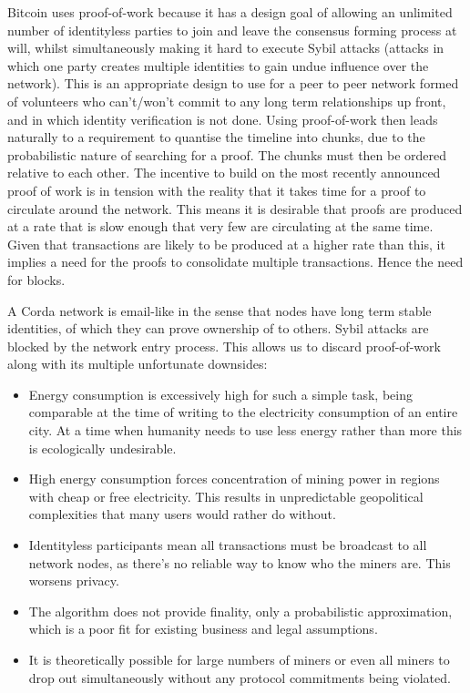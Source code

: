 \documentclass{article}
\begin{document}
Bitcoin uses proof-of-work because it has a design goal of allowing an unlimited number of identityless parties to
join and leave the consensus forming process at will, whilst simultaneously making it hard to execute Sybil attacks (attacks in which
one party creates multiple identities to gain undue influence over the network). This is an appropriate design to
use for a peer to peer network formed of volunteers who can't/won't commit to any long term relationships up front,
and in which identity verification is not done. Using proof-of-work then leads naturally to a requirement to
quantise the timeline into chunks, due to the probabilistic nature of searching for a proof. The chunks must then
be ordered relative to each other. The incentive to build on the most recently announced proof of work is in
tension with the reality that it takes time for a proof to circulate around the network. This means it is desirable
that proofs are produced at a rate that is slow enough that very few are circulating at the same time. Given that
transactions are likely to be produced at a higher rate than this, it implies a need for the proofs to consolidate
multiple transactions. Hence the need for blocks.

A Corda network is email-like in the sense that nodes have long term stable identities, of which they can prove
ownership of to others. Sybil attacks are blocked by the network entry process. This allows us to discard
proof-of-work along with its multiple unfortunate downsides:

\begin{itemize}
\item Energy consumption is excessively high for such a simple task, being comparable at the time of writing to the
electricity consumption of an entire city\cite{BitcoinEnergy}. At a time when humanity needs to use less energy
rather than more this is ecologically undesirable.
\item High energy consumption forces concentration of mining power in regions with cheap or free electricity.
This results in unpredictable geopolitical complexities that many users would rather do without.
\item Identityless participants mean all transactions must be broadcast to all network nodes, as there's no reliable
way to know who the miners are. This worsens privacy.
\item The algorithm does not provide finality, only a probabilistic approximation, which is a poor fit for existing
business and legal assumptions.\cite{Swanson}
\item It is theoretically possible for large numbers of miners or even all miners to drop out simultaneously without
any protocol commitments being violated.
\end{itemize}
\end{document}
